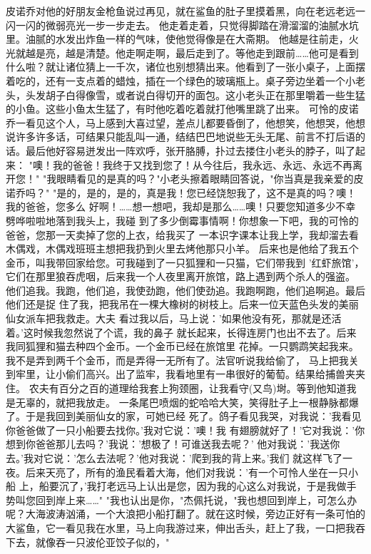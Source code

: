 \documentclass[12pt,UTF8]{ctexbook}
\begin{document}
皮诺乔对他的好朋友金枪鱼说过再见，就在鲨鱼的肚子里摸着黑，向在老远老远一闪一闪的微弱亮光一步一步走去。
他走着走着，只觉得脚踏在滑溜溜的油腻水坑里。油腻的水发出炸鱼一样的气味，使他觉得像是在大斋期。
他越是往前走，火光就越是亮，越是清楚。他走啊走啊，最后走到了。等他走到跟前……他可是看到什么啦？就让诸位猜上一千次，诸位也别想猜出来。他看到了一张小桌子，上面摆着吃的，还有一支点着的蜡烛，插在一个绿色的玻璃瓶上。桌子旁边坐着一个小老头，头发胡子白得像雪，或者说白得切开的面包。这小老头正在那里嚼着一些生猛的小鱼。这些小鱼太生猛了，有时他吃着吃着就打他嘴里跳了出来。
可怜的皮诺乔一看见这个人，马上感到大喜过望，差点儿都要昏倒了，他想笑，他想哭，他想说许多许多话，可结果只能乱叫一通，结结巴巴地说些无头无尾、前言不打后语的话。最后他好容易迸发出一阵欢呼，张开胳膊，扑过去搂住小老头的脖子，叫了起来：
"噢！我的爸爸！我终于又找到您了！从今往后，我永远、永远、永远不再离开您！"
"我眼睛看见的是真的吗？"小老头擦着眼睛回答说，"你当真是我亲爱的皮诺乔吗？"
"是的，是的，是的，真是我！您已经饶恕我了，这不是真的吗？噢！我的爸爸，您多么
好啊！……想一想吧，我却是那么……噢！只要您知道多少不幸劈哗啦啦地落到我头上，我碰
到了多少倒霉事情啊！你想象一下吧，我的可怜的爸爸，您那一天卖掉了您的上衣，给我买了
一本识字课本让我上学，我却溜去看木偶戏，木偶戏班班主想把我扔到火里去烤他那只小羊。
后来也是他给了我五个金币，叫我带回家给您。可我碰到了一只狐狸和一只猫，它们带我到
'红虾旅馆'，它们在那里狼吞虎咽，后来我一个人夜里离开旅馆，路上遇到两个杀人的强盗。
他们追我。我跑，他们追，我使劲跑，他们使劲追。我跑啊跑，他们追啊追。最后他们还是捉
住了我，把我吊在一棵大橡树的树枝上。后来一位天蓝色头发的美丽仙女派车把我救走。大夫
看过我以后，马上说：'如果他没有死，那就是还活着。'这时候我忽然说了个谎，我的鼻子
就长起来，长得连房门也出不去了。后来我同狐狸和猫去种四个金币。一个金币已经在旅馆里
花掉。一只鹦鹉笑起我来。我不是弄到两千个金币，而是弄得一无所有了。法官听说我给偷了，
马上把我关到牢里，让小偷们高兴。出了监牢，我看地里有一串很好的葡萄。结果给捕兽夹夹住。
农夫有百分之百的道理给我套上狗颈圈，让我看守(又鸟)埘。等到他知道我是无辜的，就把我放走。
一条尾巴喷烟的蛇哈哈大笑，笑得肚子上一根静脉都爆了。于是我回到美丽仙女的家，可她已经
死了。鸽子看见我哭，对我说：'我看见你爸爸做了一只小船要去找你。'我对它说：'噢！我
有翅膀就好了！'它对我说：'你想到你爸爸那儿去吗？'我说：'想极了！可谁送我去呢？'
他对我说：'我送你去。'我对它说：'怎么去法呢？'他对我说：'爬到我的背上来。'我们
就这样飞了一夜。后来天亮了，所有的渔民看着大海，他们对我说：'有一个可怜人坐在一只小船
上，船要沉了，'我打老远马上认出是您，因为我的心这么对我说，于是我做手势叫您回到岸上来……"
"我也认出是你，"杰佩托说，"我也想回到岸上，可怎么办呢？大海波涛汹涌，一个大浪把小船打翻了。就在这时候，旁边正好有一条可怕的大鲨鱼，它一看见我在水里，马上向我游过来，伸出舌头，赶上了我，一口把我吞下去，就像吞一只波伦亚饺子似的，"
\end{document}
